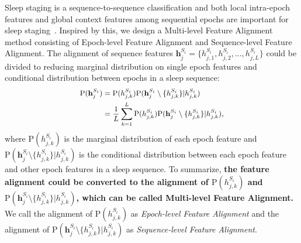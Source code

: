 \documentclass[letterpaper]{article} %
\begin{document}
	Sleep staging is a sequence-to-sequence classification and both local intra-epoch features and global context features among sequential epochs are important for sleep staging~\citep{Eldele2021AnAD, Phan2021XSleepNetMS}. Inspired by this, we design a Multi-level Feature Alignment method consisting of Epoch-level Feature Alignment and Sequence-level Feature Alignment.
	The alignment of sequence features $\mathrm{\mathbf{h}}^{S_i}_j = \{h^{S_i}_{j, 1}, h^{S_i}_{j, 2}, ... , h^{S_i}_{j, L}\}$ could be divided to reducing marginal distribution on single epoch features and conditional distribution between epochs in a sleep sequence:%
	\begin{equation}
		\label{diveded}
		\small
		\begin{split}
			\mathrm{P}(\mathrm{\mathbf{h}}^{S_i}_j)&=\mathrm{P}(h^{S_i}_{j, k})\mathrm{P}(\mathrm{\mathbf{h}}^{S_i}_j \setminus \{h^{S_i}_{j, k}\}|h^{S_i}_{j, k})\\
			&= \frac{1}{L}\sum^{L}_{k=1}\mathrm{P}(h^{S_i}_{j, k})\mathrm{P}(\mathrm{\mathbf{h}}^{S_i}_j \setminus \{h^{S_i}_{j, k}\}|h^{S_i}_{j, k}),
		\end{split}
	\end{equation}
	where $\mathrm{P}(h^{S_i}_{j, k})$ is the marginal distribution of each epoch feature and $\mathrm{P}(\mathrm{\mathbf{h}}^{S_i}_j\setminus \{h^{S_i}_{j, k}\}|h^{S_i}_{j, k})$ is the conditional distribution between each epoch feature and other epoch features in a sleep sequence.
	To summarize, \textbf{the feature alignment could be converted to the alignment of $\mathrm{P}(h^{S_i}_{j, k})$ and $\mathrm{P}(\mathrm{\mathbf{h}}^{S_i}_j\setminus \{h^{S_i}_{j, k}\}|h^{S_i}_{j, k})$, which can be called Multi-level Feature Alignment.}
	We call the alignment of $\mathrm{P}(h^{S_i}_{j, k})$ as \textit{Epoch-level Feature Alignment} and the alignment of  $\mathrm{P}(\mathrm{\mathbf{h}}^{S_i}_j\setminus \{h^{S_i}_{j, k}\}|h^{S_i}_{j, k})$ as \textit{Sequence-level Feature Alignment}.
\end{document}

